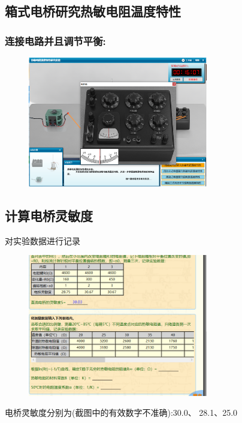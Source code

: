 \documentclass{article}
\begin{document}
\subsection*{箱式电桥研究热敏电阻温度特性}
\subsubsection*{连接电路并且调节平衡:}
\begin{figure}[H]
    \centering
    \includegraphics[width=0.7\textwidth]{虚拟3/1.png}
    
\end{figure}

\subsection*{计算电桥灵敏度}
对实验数据进行记录
\begin{figure}[H]
    \centering
    \includegraphics[width=0.7\textwidth]{虚拟3/4.png}
    
\end{figure}

电桥灵敏度分别为(截图中的有效数字不准确):30.0、 28.1、25.0
\end{document}
